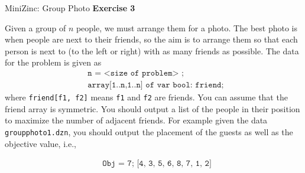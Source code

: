 \begin{frame}{MiniZinc: Group Photo}
\textbf{Exercise 3}

Given a group of $n$ people, we must arrange them for a photo. The best
photo is when people are next to their friends, so the aim is to arrange them so that each person
is next to (to the left or right) with as many friends as possible. The data for the
problem is given as
%
\begin{align*}
& \texttt{n = <size of problem> ;} \\
& \texttt{array[1..n,1..n] of var bool: friend; }
\end{align*} 
%
where \texttt{friend[f1, f2]} means \texttt{f1} and \texttt{f2} are friends. You can assume that the friend array is symmetric.
You should output a list of the people in their position to maximize the number of adjacent
friends. For example given the data \texttt{groupphoto1.dzn}, you should output the placement of the guests as well as the objective value, i.e.,

\begin{align*}
& \texttt{Obj = 7; [4, 3, 5, 6, 8, 7, 1, 2]}
\end{align*}


\end{frame}
